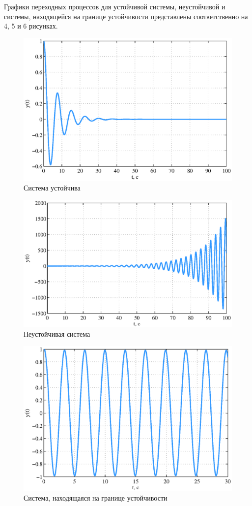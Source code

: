 \documentclass[a4paper,12pt]{article} %
\begin{document}
Графики переходных процессов для устойчивой системы, неустойчивой и системы, находящейся на границе устойчивости представлены соответственно на 4, 5 и 6 рисунках.
\begin{figure}[H]
	\centering
	\includegraphics[width=1\linewidth]{scheme/plot1.eps}
	\caption{Система устойчива}
\end{figure}
\begin{figure}[H]
	\centering
	\includegraphics[width=1\linewidth]{scheme/plot2.eps}
	\caption{Неустойчивая система}
\end{figure}
\begin{figure}[H]
	\centering
	\includegraphics[width=1\linewidth]{scheme/plot3.eps}
	\caption{Система, находящаяся на границе устойчивости}
\end{figure}
\end{document}
